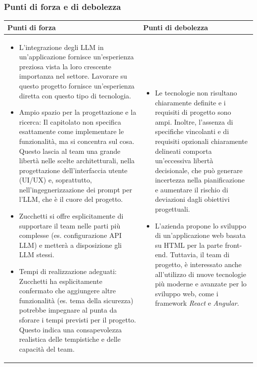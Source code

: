 \documentclass[a4paper,11pt]{article}
\begin{document}
\subsubsection{Punti di forza e di debolezza}
{\footnotesize
\begin{tabularx}{\textwidth}{|X|X|}
\hline
\rowcolor{lightgray!40} %
\textbf{Punti di forza} & \textbf{Punti di debolezza} \\
\hline
\begin{itemize}
\item  L'integrazione degli LLM in un'applicazione fornisce un'esperienza preziosa vista la loro crescente importanza nel settore. Lavorare su questo progetto fornisce un'esperienza diretta con questo tipo di tecnologia.
\item  Ampio spazio per la progettazione e la ricerca: Il capitolato non specifica esattamente come implementare le funzionalità, ma si concentra sul cosa. Questo lascia al team una grande libertà nelle scelte architetturali, nella progettazione dell'interfaccia utente (UI/UX) e, soprattutto, nell'ingegnerizzazione dei prompt per l'LLM, che è il cuore del progetto.
\item Zucchetti si offre esplicitamente di supportare il team nelle parti più complesse (es. configurazione API LLM) e metterà a disposizione gli LLM stessi. 
\item Tempi di realizzazione adeguati: Zucchetti ha esplicitamente confermato che aggiungere altre funzionalità (es. tema della sicurezza) potrebbe impegnare al punta da sforare i tempi previsti per il progetto. Questo indica una consapevolezza realistica delle tempistiche e delle capacità del team.
\end{itemize}
 & \begin{itemize}
\item Le tecnologie non risultano chiaramente definite e i requisiti di progetto sono ampi. Inoltre, l'assenza di specifiche vincolanti e di requisiti opzionali chiaramente delineati comporta un'eccessiva libertà decisionale, che può generare incertezza nella pianificazione e aumentare il rischio di deviazioni dagli obiettivi progettuali.
\item  L'azienda propone lo sviluppo di un'applicazione web basata su HTML per la parte front-end. Tuttavia, il team di progetto, è interessato anche all'utilizzo di nuove tecnologie più moderne e avanzate per lo sviluppo web, come i framework \textit{React} e \textit{Angular}. 
\end{itemize} \\
\hline
\end{tabularx}
}
\end{document}
